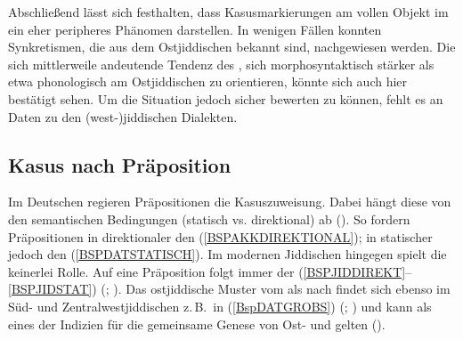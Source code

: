 Abschließend lässt sich festhalten, dass Kasusmarkierungen am vollen Objekt im \hai{{\LiJi}} ein eher peripheres Phänomen darstellen. In wenigen Fällen konnten Synkretismen, die aus dem Ostjiddischen bekannt sind, nachgewiesen werden. Die sich mittlerweile andeutende Tendenz des \hai{{\LiJi}}, sich morphosyntaktisch stärker als etwa phonologisch am Ostjiddischen zu orientieren, könnte sich auch hier bestätigt sehen. Um die Situation jedoch sicher bewerten zu können, fehlt es an Daten zu den (west-)jiddischen Dialekten.
 
   \subsection{Kasus nach Präposition}\label{kasuspräp}
  
Im Deutschen regieren Präpositionen die Kasuszuweisung. Dabei hängt diese von den semantischen Bedingungen (statisch vs. direktional) ab (\citealt[23]{PittnerBerman2007}). So fordern Präpositionen in direktionaler  den  (\ref{BSPAKKDIREKTIONAL}); in statischer  jedoch den  (\ref{BSPDATSTATISCH}). Im modernen Jiddischen hingegen spielt die  keinerlei Rolle. Auf eine Präposition folgt immer der  (\ref{BSPJIDDIREKT}–\ref{BSPJIDSTAT}) (\citealt[202]{Jacobs2005}; \citealt{FleischerSchaefer2012}). Das ostjiddische Muster vom  als  nach  findet sich ebenso im Süd- und Zentralwestjiddischen z.\,B.\, in (\ref{BspDATGROBS}) (\citealt{FleischerSchaefer2012}; \citealt[24]{GuggenheimGruenberg1966}) und kann als eines der Indizien für die gemeinsame Genese von Ost- und  gelten (\citealt{Fleischer2014}).
 
